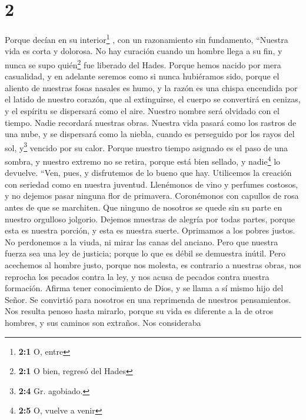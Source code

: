 \hypertarget{section-1}{%
\section{2}\label{section-1}}

 Porque decían en su interior\footnote{\textbf{2:1} O,
  entre} , con un razonamiento sin fundamento, ``Nuestra vida es corta y
dolorosa. No hay curación cuando un hombre llega a su fin, y nunca se
supo quién\footnote{\textbf{2:1} O bien, regresó del Hades} fue liberado
del Hades.  Porque hemos nacido por mera casualidad, y en
adelante seremos como si nunca hubiéramos sido, porque el aliento de
nuestras fosas nasales es humo, y la razón es una chispa encendida por
el latido de nuestro corazón,  que al extinguirse, el
cuerpo se convertirá en cenizas, y el espíritu se dispersará como el
aire.  Nuestro nombre será olvidado con el tiempo. Nadie
recordará nuestras obras. Nuestra vida pasará como los rastros de una
nube, y se dispersará como la niebla, cuando es perseguido por los rayos
del sol, y\footnote{\textbf{2:4} Gr. agobiado.} vencido por su calor.
 Porque nuestro tiempo asignado es el paso de una sombra,
y nuestro extremo no se retira, porque está bien sellado, y
nadie\footnote{\textbf{2:5} O, vuelve a venir} lo devuelve.
 ``Ven, pues, y disfrutemos de lo bueno que hay.
Utilicemos la creación con seriedad como en nuestra juventud.
 Llenémonos de vino y perfumes costosos, y no dejemos
pasar ninguna flor de primavera.  Coronémonos con capullos
de rosa antes de que se marchiten.  Que ninguno de
nosotros se quede sin su parte en nuestro orgulloso jolgorio. Dejemos
muestras de alegría por todas partes, porque esta es nuestra porción, y
esta es nuestra suerte.  Oprimamos a los pobres justos.
No perdonemos a la viuda, ni mirar las canas del anciano.
 Pero que nuestra fuerza sea una ley de justicia; porque
lo que es débil se demuestra inútil.  Pero acechemos al
hombre justo, porque nos molesta, es contrario a nuestras obras, nos
reprocha los pecados contra la ley, y nos acusa de pecados contra
nuestra formación.  Afirma tener conocimiento de Dios, y
se llama a sí mismo hijo del Señor.  Se convirtió para
nosotros en una reprimenda de nuestros pensamientos.  Nos
resulta penoso hasta mirarlo, porque su vida es diferente a la de otros
hombres, y sus caminos son extraños.  Nos consideraba
